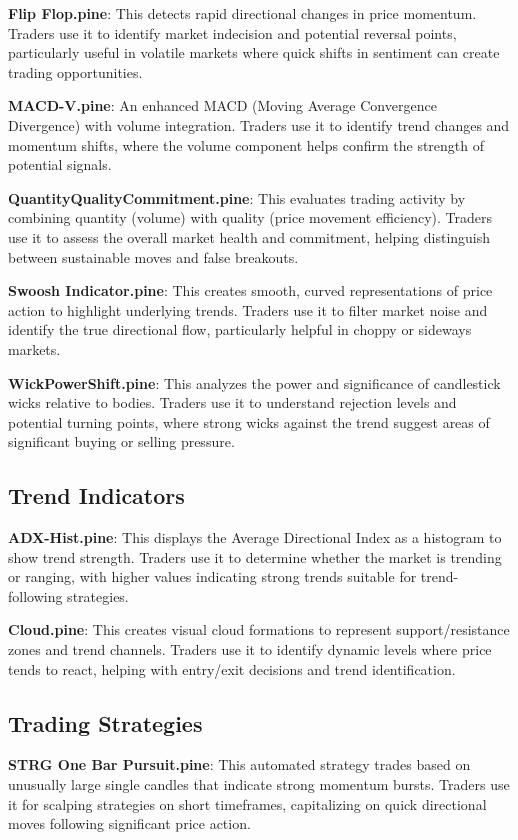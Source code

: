 \documentclass[12pt]{article}
\begin{document}
\textbf{Flip Flop.pine}: This detects rapid directional changes in price momentum. Traders use it to identify market indecision and potential reversal points, particularly useful in volatile markets where quick shifts in sentiment can create trading opportunities.

\textbf{MACD-V.pine}: An enhanced MACD (Moving Average Convergence Divergence) with volume integration. Traders use it to identify trend changes and momentum shifts, where the volume component helps confirm the strength of potential signals.

\textbf{QuantityQualityCommitment.pine}: This evaluates trading activity by combining quantity (volume) with quality (price movement efficiency). Traders use it to assess the overall market health and commitment, helping distinguish between sustainable moves and false breakouts.

\textbf{Swoosh Indicator.pine}: This creates smooth, curved representations of price action to highlight underlying trends. Traders use it to filter market noise and identify the true directional flow, particularly helpful in choppy or sideways markets.

\textbf{WickPowerShift.pine}: This analyzes the power and significance of candlestick wicks relative to bodies. Traders use it to understand rejection levels and potential turning points, where strong wicks against the trend suggest areas of significant buying or selling pressure.

\subsection{Trend Indicators}

\textbf{ADX-Hist.pine}: This displays the Average Directional Index as a histogram to show trend strength. Traders use it to determine whether the market is trending or ranging, with higher values indicating strong trends suitable for trend-following strategies.

\textbf{Cloud.pine}: This creates visual cloud formations to represent support/resistance zones and trend channels. Traders use it to identify dynamic levels where price tends to react, helping with entry/exit decisions and trend identification.

\subsection{Trading Strategies}

\textbf{STRG One Bar Pursuit.pine}: This automated strategy trades based on unusually large single candles that indicate strong momentum bursts. Traders use it for scalping strategies on short timeframes, capitalizing on quick directional moves following significant price action.
\end{document}
